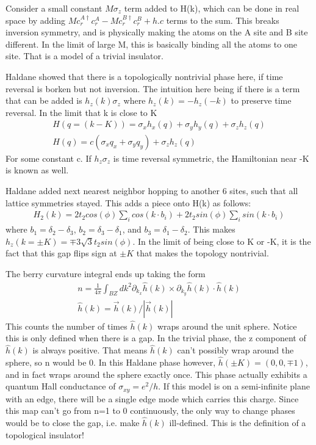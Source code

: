 Consider a small constant $M\sigma_z$ term added to H(k), which can be done in real space by adding $Mc^{A\dagger}_rc^A_r - Mc^{B\dagger}_rc^B_r +h.c$ terms to the sum. This breaks inversion symmetry, and is physically making the atoms on the A site and B site different. In the limit of large M, this is basically binding all the atoms to one site. That is a model of a trivial insulator.

Haldane showed that there is a topologically nontrivial phase here, if time reversal is borken but not inversion. The intuition here being if there is a term that can be added is $h_z(k)\sigma_z$ where $h_z(k)=-h_z(-k)$ to preserve time reversal. In the limit that k is close to K
\begin{align}
H(q=(k-K))= \sigma_x h_x(q) + \sigma_y h_y(q) + \sigma_z h_z(q)\\
H(q)= c(\sigma_x q_x + \sigma_y  q_y) + \sigma_z h_z(q)
\end{align}
For some constant c. If $h_z\sigma_z$ is time reversal symmetric, the Hamiltonian near -K is known as well. 

 Haldane added next nearest neighbor hopping to another 6 sites, such that all lattice symmetries stayed. This adds a piece onto H(k) as follows:
\begin{align}
H_2(k) =  2t_2 cos(\phi)\sum_i cos(k \cdot b_i)  +2t_2 sin(\phi) \sum_i sin(k \cdot b_i)
\end{align} 
where $b_1 = \delta_2 - \delta_3$, $b_2 = \delta_3 - \delta_1$, and $b_3 = \delta_1-\delta_2.$ This makes $h_z(k=\pm K) = \mp 3\sqrt{3}t_2sin(\phi)$. In the limit of being close to K or -K, it is the fact that this gap flips sign at $\pm K$ that makes the topology nontrivial.

The berry curvature integral ends up taking the form
\begin{align}
n = \frac{1}{4\pi}\int_{BZ}dk^2 \partial_{k_x}\hat{h}(k) \times \partial_{k_y}\hat{h}(k) \cdot \hat{h}(k) \\
\hat{h}(k) = \vec{h}(k)/|\vec{h}(k)|
\end{align} 
This counts the number of times $\hat{h}(k)$ wraps around the unit sphere. Notice this is only defined when there is a gap. In the trivial phase, the z component of $\hat{h}(k)$ is always positive. That means $\hat{h}(k)$ can't possibly wrap around the sphere, so n would be 0. In this Haldane phase however, $\hat{h}(\pm K) = (0,0,\mp 1)$, and in fact wraps around the sphere exactly once. This phase actually exhibits a quantum Hall conductance of $\sigma_{xy}=e^2/h$. If this model is on a semi-infinite plane with an edge, there will be a single edge mode which carries this charge. Since this map can't go from n=1 to 0 continuously, the only way to change phases would be to close the gap, i.e. make $\hat{h}(k)$ ill-defined. This is the definition of a topological insulator! 

